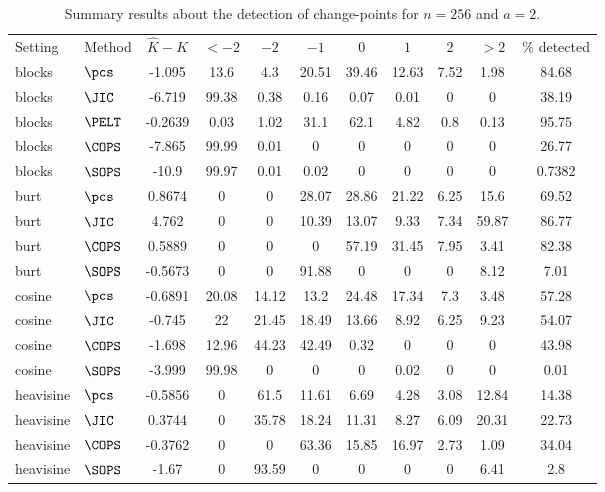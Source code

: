 \begin{table}[ht]
\centering
\begin{tabular}{llccccccccc}
 Setting & Method & $\hat{K} - K$ & $< -2$ & $-2$ & $-1$ & $0$ & $1$ & $2$ & $> 2$ & \% detected \\ 
 blocks & $\pcs$ & -1.095 &  13.6 &   4.3 & 20.51 & 39.46 & 12.63 &  7.52 &  1.98 & 84.68 \\ 
  blocks & $\JIC$ & -6.719 & 99.38 &  0.38 &  0.16 &  0.07 &  0.01 &     0 &     0 & 38.19 \\ 
  blocks & $\PELT$ & -0.2639 &  0.03 &  1.02 &  31.1 &  62.1 &  4.82 &   0.8 &  0.13 & 95.75 \\ 
  blocks & $\COPS$ & -7.865 & 99.99 &  0.01 &     0 &     0 &     0 &     0 &     0 & 26.77 \\ 
  blocks & $\SOPS$ & -10.9 & 99.97 &  0.01 &  0.02 &     0 &     0 &     0 &     0 & 0.7382 \\ 
   \hline
burt & $\pcs$ & 0.8674 &     0 &     0 & 28.07 & 28.86 & 21.22 &  6.25 &  15.6 & 69.52 \\ 
  burt & $\JIC$ & 4.762 &     0 &     0 & 10.39 & 13.07 &  9.33 &  7.34 & 59.87 & 86.77 \\ 
  burt & $\COPS$ & 0.5889 &     0 &     0 &     0 & 57.19 & 31.45 &  7.95 &  3.41 & 82.38 \\ 
  burt & $\SOPS$ & -0.5673 &     0 &     0 & 91.88 &     0 &     0 &     0 &  8.12 &  7.01 \\ 
  cosine & $\pcs$ & -0.6891 & 20.08 & 14.12 &  13.2 & 24.48 & 17.34 &   7.3 &  3.48 & 57.28 \\ 
   \hline
cosine & $\JIC$ & -0.745 &    22 & 21.45 & 18.49 & 13.66 &  8.92 &  6.25 &  9.23 & 54.07 \\ 
  cosine & $\COPS$ & -1.698 & 12.96 & 44.23 & 42.49 &  0.32 &     0 &     0 &     0 & 43.98 \\ 
  cosine & $\SOPS$ & -3.999 & 99.98 &     0 &     0 &     0 &  0.02 &     0 &     0 &  0.01 \\ 
  heavisine & $\pcs$ & -0.5856 &     0 &  61.5 & 11.61 &  6.69 &  4.28 &  3.08 & 12.84 & 14.38 \\ 
  heavisine & $\JIC$ & 0.3744 &     0 & 35.78 & 18.24 & 11.31 &  8.27 &  6.09 & 20.31 & 22.73 \\ 
   \hline
heavisine & $\COPS$ & -0.3762 &     0 &     0 & 63.36 & 15.85 & 16.97 &  2.73 &  1.09 & 34.04 \\ 
  heavisine & $\SOPS$ & -1.67 &     0 & 93.59 &     0 &     0 &     0 &     0 &  6.41 &   2.8 \\ 
  \end{tabular}
\caption{Summary results about the detection of change-points for $n = 256$ and $a = 2$.} 
\label{tab:CPn256a2}
\end{table}

